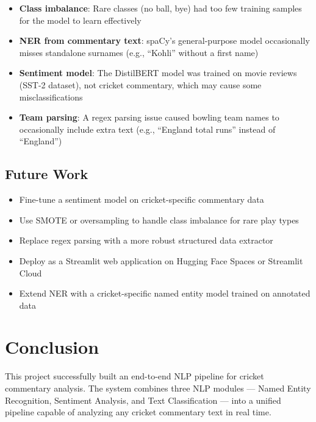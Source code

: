 \documentclass[12pt,a4paper]{article}
\begin{document}
\begin{itemize}[leftmargin=1.5em]
  \item \textbf{Class imbalance}: Rare classes (no ball, bye) had too few training samples for the model to learn effectively
  \item \textbf{NER from commentary text}: spaCy's general-purpose model occasionally misses standalone surnames (e.g., ``Kohli'' without a first name)
  \item \textbf{Sentiment model}: The DistilBERT model was trained on movie reviews (SST-2 dataset), not cricket commentary, which may cause some misclassifications
  \item \textbf{Team parsing}: A regex parsing issue caused bowling team names to occasionally include extra text (e.g., ``England total runs'' instead of ``England'')
\end{itemize}

\subsection{Future Work}

\begin{itemize}[leftmargin=1.5em]
  \item Fine-tune a sentiment model on cricket-specific commentary data
  \item Use SMOTE or oversampling to handle class imbalance for rare play types
  \item Replace regex parsing with a more robust structured data extractor
  \item Deploy as a Streamlit web application on Hugging Face Spaces or Streamlit Cloud
  \item Extend NER with a cricket-specific named entity model trained on annotated data
\end{itemize}

\section{Conclusion}

This project successfully built an end-to-end NLP pipeline for cricket commentary analysis. The system combines three NLP modules — Named Entity Recognition, Sentiment Analysis, and Text Classification — into a unified pipeline capable of analyzing any cricket commentary text in real time.
\end{document}
